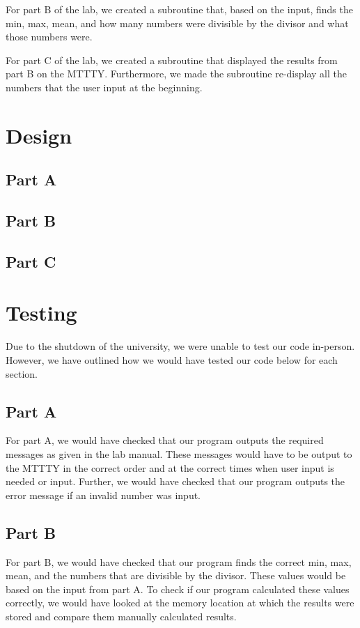 \documentclass[10pt, letterpaper, titlepage]{article} %
\begin{document}
\begin{multicols*}{2}
For part B of the lab, we created a subroutine that, based on the input, finds the min, max, mean, and how many numbers were divisible by the divisor and what those numbers were.

For part C of the lab, we created a subroutine that displayed the results from part B on the MTTTY. 
Furthermore, we made the subroutine re-display all the numbers that the user input at the beginning. 

\section{Design}
\subsection{Part A}


\subsection{Part B}


\subsection{Part C}


\section{Testing}
Due to the shutdown of the university, we were unable to test our code in-person. 
However, we have outlined how we would have tested our code below for each section.

\subsection{Part A}
For part A, we would have checked that our program outputs the required messages as given in the lab manual. 
These messages would have to be output to the MTTTY in the correct order and at the correct times when user input is needed or input. 
Further, we would have checked that our program outputs the error message if an invalid number was input.

\subsection{Part B}
For part B, we would have checked that our program finds the correct min, max, mean, and the numbers that are divisible by the divisor. 
These values would be based on the input from part A. 
To check if our program calculated these values correctly, we would have looked at the memory location at which the results were stored and compare them manually calculated results.


\end{multicols*}
\end{document}
